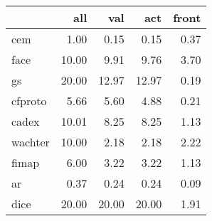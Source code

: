 \begin{tabular}{lrrrr}
\hline
{} &    all &    val &    act &  front \\ \hline
\hline
cem                 &   1.00 &   0.15 &   0.15 &   0.37 \\ \hline
face                &  10.00 &   9.91 &   9.76 &   3.70 \\ \hline
gs     &  20.00 &  12.97 &  12.97 &   0.19 \\ \hline
cfproto             &   5.66 &   5.60 &   4.88 &   0.21 \\ \hline
cadex               &  10.01 &   8.25 &   8.25 &   1.13 \\ \hline
wachter             &  10.00 &   2.18 &   2.18 &   2.22 \\ \hline
fimap               &   6.00 &   3.22 &   3.22 &   1.13 \\ \hline
ar &   0.37 &   0.24 &   0.24 &   0.09 \\ \hline
dice                &  20.00 &  20.00 &  20.00 &   1.91 \\ \hline
\hline
\end{tabular}
